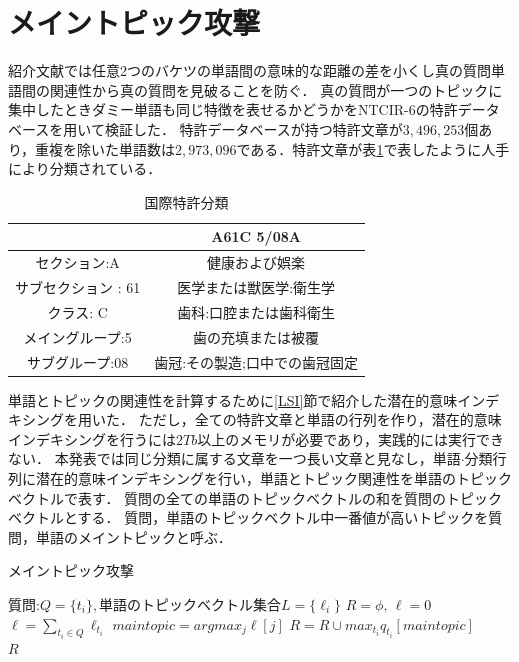 \documentclass{jsarticle}
\theoremstyle{definition}
\begin{document}
\section{メイントピック攻撃}
紹介文献では任意2つのバケツの単語間の意味的な距離の差を小くし真の質問単語間の関連性から真の質問を見破ることを防ぐ．
真の質問が一つのトピックに集中したときダミー単語も同じ特徴を表せるかどうかをNTCIR-6の特許データベース\cite{fujii_overview_2007}を用いて検証した．
特許データベースが持つ特許文章が$3,496,253$個あり，重複を除いた単語数は$2,973,096$である．特許文章が表\ref{tab:class}で表したように人手により分類されている．

\begin{table}[!hbp]
\center
\begin{tabular}{|c|c|}
\hline
&A61C 5/08A \\
\hline
セクション:A & 健康および娯楽 \\
サブセクション : 61 & 医学または獣医学:衛生学 \\
クラス: C & 歯科:口腔または歯科衛生 \\
メイングループ:5 & 歯の充填または被覆 \\
サブグループ:08 & 歯冠:その製造;口中での歯冠固定 \\
\hline
\end{tabular}
\caption{国際特許分類}\label{tab:class}
\end{table}

単語とトピックの関連性を計算するために\ref{LSI}節で紹介した潜在的意味インデキシングを用いた．
ただし，全ての特許文章と単語の行列を作り，潜在的意味インデキシングを行うには$2Tb$以上のメモリが必要であり，実践的には実行できない．
本発表では同じ分類に属する文章を一つ長い文章と見なし，単語$\cdot$分類行列に潜在的意味インデキシングを行い，単語とトピック関連性を単語のトピックベクトルで表す．
質問の全ての単語のトピックベクトルの和を質問のトピックベクトルとする．
質問，単語のトピックベクトル中一番値が高いトピックを質問，単語のメイントピックと呼ぶ．

\begin{algorithm}
\caption{メイントピック攻撃}
\begin{algorithmic}[1]
	\Require 質問:$Q=\{t_i\},$単語のトピックベクトル集合$L=\{\ell_i\}$
	\State $R=\phi, \, \ell=0$
	\State $\ell=\sum_{t_i \in Q}\ell_{t_i}$
	\State $maintopic=argmax_j \ell[j]$
	\State $R=R \cup max_{t_i}q_{t_i}[maintopic]$
	\EndFor　\\ 
	\Return $R$
\end{algorithmic}
\end{algorithm}
\end{document}
